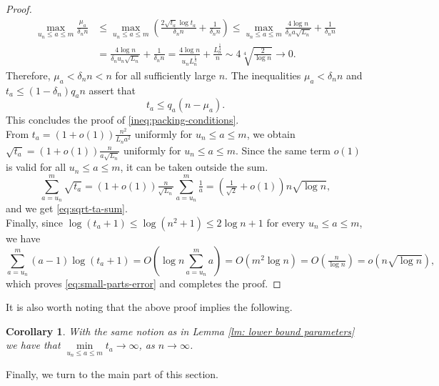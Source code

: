 \documentclass[12pt,a4paper]{amsart}
\numberwithin{equation}{section}
\theoremstyle{plain}
\newtheorem{cor}[thm]{Corollary}
\theoremstyle{definition}
\theoremstyle{remark}
\newtheorem{re}[thm]{Remark}
\begin{document}
\begin{proof}
\begin{align*}
    \max\limits_{u_n\le  a\le  m}
\frac{\mu_a}{\delta_n n}
&\le 
\max\limits_{u_n\le  a\le  m}
\left(
\frac{2\sqrt{t_a}\log t_a}{\delta_n n}
+\frac{1}{\delta_n n}
\right)
\le 
\max\limits_{u_n\le  a\le  m}
\frac{4\log n}{\delta_n a\sqrt{L_n}}
+\frac{1}{\delta_n n}\\
&=
\frac{4\log n}{\delta_n u_n\sqrt{L_n}}
+\frac{1}{\delta_n n}
=
\frac{4\log n}{u_nL_n^{\frac{1}{4}}}
+\frac{L_n^{\frac{1}{4}}}{n}
\sim
4\sqrt[4]{\frac{2}{\log n}}
\longrightarrow0.
\end{align*}
Therefore, $\mu_a< \delta_n n<n$ for all sufficiently large $n$.
The inequalities $\mu_a<\delta_n n$ and $t_a\le (1-\delta_n)q_an$ assert that
$$
t_a\le  q_a(n-\mu_a).
$$
This concludes the proof of \eqref{ineq:packing-conditions}.\\
From
$
t_a=(1+o(1))\frac{n^2}{L_na^2}
$
uniformly for $u_n\le  a\le  m$, we obtain
$
\sqrt{t_a}
=
(1+o(1))\frac{n}{a\sqrt{L_n}}
$
uniformly for $u_n\le  a\le  m$. Since the same term $o(1)$ is valid for all $u_n\le  a\le  m$, it can be taken outside the sum.
$$
\sum_{a=u_n}^{m}\sqrt{t_a}
=
(1+o(1))
\tfrac{n}{\sqrt{L_n}}
\sum_{a=u_n}^{m}\tfrac1a
=
\left(\tfrac1{\sqrt2}+o(1)\right)n\sqrt{\log n},
$$
and we get \eqref{eq:sqrt-ta-sum}.\\
Finally, since $\log(t_a+1)\le\log(n^2+1)\le 2\log n+1$
for every $u_n\le a\le  m$, we have
$$
\sum_{a=u_n}^{m}(a-1)\log(t_a+1)
=
O\left(
\log n
\sum_{a=u_n}^{m}a
\right)
=
O(m^2\log n)
=
O\left(\tfrac{n}{\log n}\right)
=
o(n\sqrt{\log n}),
$$
which proves \eqref{eq:small-parts-error} and completes the proof.
\end{proof}
It is also worth noting that the above proof implies the following.

\begin{cor}\label{cor: min}
With the same notion as in Lemma \ref{lm: lower bound parameters} we have that $\min\limits_{u_n\le  a\le  m}t_a\to\infty$, as $n\to \infty$.
\end{cor}

Finally, we turn to the main part of this section.
\end{document}
